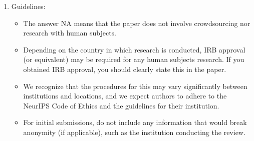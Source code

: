 \documentclass{article}
\begin{document}
\begin{enumerate}
    \item[] Guidelines:
    \begin{itemize}
        \item The answer NA means that the paper does not involve crowdsourcing nor research with human subjects.
        \item Depending on the country in which research is conducted, IRB approval (or equivalent) may be required for any human subjects research. If you obtained IRB approval, you should clearly state this in the paper. 
        \item We recognize that the procedures for this may vary significantly between institutions and locations, and we expect authors to adhere to the NeurIPS Code of Ethics and the guidelines for their institution. 
        \item For initial submissions, do not include any information that would break anonymity (if applicable), such as the institution conducting the review.
    \end{itemize}

\end{enumerate}
\end{document}

